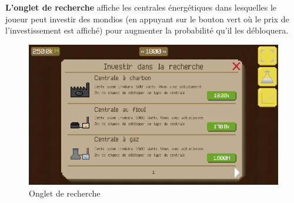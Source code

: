 \documentclass{article}
\begin{document}
		
		\textbf{L'onglet de recherche} affiche les centrales énergétiques dans lesquelles le joueur peut investir des mondios (en appuyant sur le bouton vert où le prix de l'investissement est affiché) pour augmenter la probabilité qu'il les débloquera.
		
		\begin{figure}[H]
                \includegraphics[width=\linewidth]{../images/recherche}
                \caption{Onglet de recherche}
                \label{fig:research}
        \end{figure}
        
\end{document}
